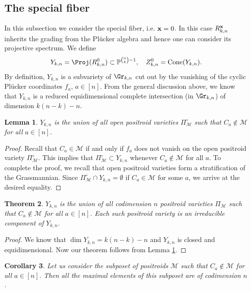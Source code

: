 \documentclass[11pt]{amsart}
\numberwithin{equation}{section}
\newtheorem{thm}{Theorem}[section]
\newtheorem{lem}[thm]{Lemma}
\newtheorem{cor}[thm]{Corollary}
\newcommand{\bP}{{\mathbb P}}
\newcommand{\bfx}{{\bf x}}
\begin{document}
\subsection{The special fiber}
In this subsection we consider the special fiber, i.e. $\bfx=0$. In this case  $R^\bfx_{k,n}$ inherits the grading from the Pl\"ucker
algebra and hence one can consider its projective spectrum. We define
\[
Y_{k,n} = \Proj(R^0_{k,n}) \subset \bP^{\binom{n}{k}-1},\quad 
Z_{k,n}^{0} = \mathrm{Cone}(Y_{k,n}).
\]
By definition, 
$Y_{k,n}$ is a subvariety of $\Gr_{k,n}$ cut out by the vanishing of the
cyclic Pl\"ucker coordinates $f_a$, $a\in [n]$. 
From the general discussion above, we know that 
$Y_{k,n}$ is a reduced equidimensional complete intersection (in $\Gr_{k,n}$) 
of dimension $k(n-k)-n$. 


\begin{lem}\label{lem:openpositr}
$Y_{k,n}$  is the union of all open positroid varieties $\Pi^\circ_{\mathcal M}$  
such that $C_a\notin\mathcal M$ for all $a\in [n]$. 
\end{lem}
\begin{proof}
Recall that $C_a\in\mathcal M$ if and only if $f_a$ does not vanish on the open
positroid variety $\Pi^\circ_{\mathcal M}$. This implies that 
$\Pi^\circ_{\mathcal M}\subset Y_{k,n}$ whenever $C_a\notin \mathcal M$ for all $a$.
To complete the proof, we recall that open positroid varieties form a stratification of
the Grassmannian. Since $\Pi^\circ_{\mathcal M}\cap Y_{k,n}=\emptyset$ if $C_a\in 
\mathcal M$ for some $a$, we arrive at the desired equality. 
\end{proof}

\begin{thm}
$Y_{k,n}$ is the union of all codimension $n$ positroid varieties $\Pi_{\mathcal M}$  
such that $C_a\notin\mathcal M$ for all $a\in [n]$. Each such positroid variety
is an irreducible component of $Y_{k,n}$.
\end{thm}
\begin{proof}
We know that $\dim Y_{k,n}=k(n-k)-n$ and $Y_{k,n}$ is closed and equidimensional. 
Now our theorem follows from Lemma \ref{lem:openpositr}.    
\end{proof}

\begin{cor}
Let us consider the subposet of positroids $\mathcal M$ such that 
$C_a\notin\mathcal M$ for all $a\in [n]$. Then all the maximal elements of this 
subposet are of codimension $n$.
\end{cor}
\end{document}
